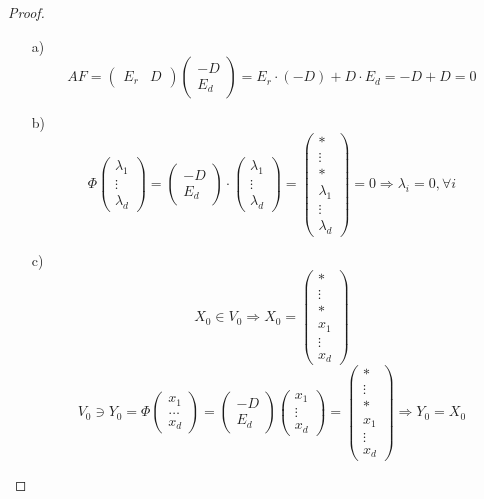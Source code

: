 \begin{proof}
\begin{itemize}
  \item [a) ] \[
      AF = \begin{pmatrix}E_r & D  \end{pmatrix} \begin{pmatrix}-D \\ E_d \end{pmatrix} = E_r \cdot (-D) + D \cdot E_d = -D + D = 0
  \]
\item [b) ] \[
\Phi \begin{pmatrix}\lambda_1 \\ \vdots \\ \lambda_d \end{pmatrix} = \begin{pmatrix}-D \\ E_d \end{pmatrix} \cdot \begin{pmatrix}\lambda_1 \\ \vdots \\ \lambda_d \end{pmatrix} = \begin{pmatrix} * \\ \vdots \\ * \\ \lambda_1 \\ \vdots \\ \lambda_d \end{pmatrix} = 0 \Rightarrow \lambda_i = 0, \forall i
\]
\item [c) ] \[
X_0 \in V_0 \Rightarrow X_0 = \begin{pmatrix} * \\ \vdots \\ * \\ x_1 \\ \vdots \\ x_d \end{pmatrix}
\]
\[
V_0 \ni Y_0 = \Phi \begin{pmatrix}x_1 \\ \ldots \\ x_d \end{pmatrix} = \begin{pmatrix} -D \\ E_d \end{pmatrix} \begin{pmatrix}x_1 \\ \vdots \\ x_d \end{pmatrix} = \begin{pmatrix} * \\ \vdots \\ * \\ x_1 \\ \vdots \\ x_d \end{pmatrix} \Rightarrow Y_0 = X_0
\]
\end{itemize}
\end{proof}
